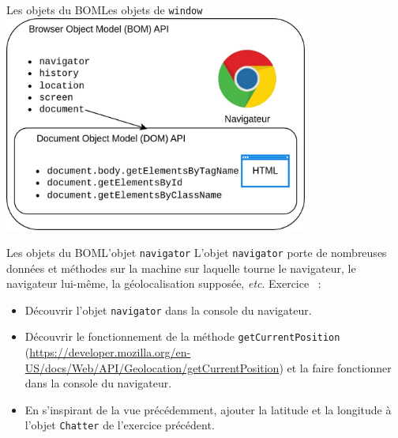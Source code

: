 \documentclass{beamer}
\begin{document}
    \begin{frame}{Les objets du BOM}{Les objets de \lstinline{window}}
        \centering
        \includegraphics[width=10cm]{image/bom-n-dom}
    \end{frame}

    \begin{frame}{Les objets du BOM}{L'objet \lstinline{navigator}}
        L'objet \lstinline{navigator} porte de nombreuses données et méthodes sur la machine sur laquelle tourne le navigateur, le navigateur lui-même, la géolocalisation supposée, \textit{etc}.
        \bigbreak
        Exercice \execcounterdispinc{}~:
        \begin{itemize}
            \item Découvrir l'objet \lstinline{navigator} dans la console du navigateur.
            \item Découvrir le fonctionnement de la méthode \lstinline{getCurrentPosition} (\url{https://developer.mozilla.org/en-US/docs/Web/API/Geolocation/getCurrentPosition}) et la faire fonctionner dans la console du navigateur.
            \item En s'inspirant de la vue précédemment, ajouter la latitude et la longitude à l'objet \lstinline{Chatter} de l'exercice précédent.
        \end{itemize}
    \end{frame}
\end{document}
